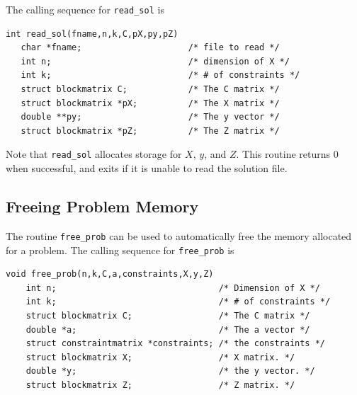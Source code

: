 \documentclass{article}
\begin{document}
The calling sequence for {\tt read\_sol} is 

\begin{verbatim}
int read_sol(fname,n,k,C,pX,py,pZ)
   char *fname;                     /* file to read */
   int n;                           /* dimension of X */
   int k;                           /* # of constraints */
   struct blockmatrix C;            /* The C matrix */
   struct blockmatrix *pX;          /* The X matrix */
   double **py;                     /* The y vector */
   struct blockmatrix *pZ;          /* The Z matrix */
\end{verbatim}
Note that {\tt read\_sol} allocates storage for $X$, $y$, and $Z$.  This
routine returns 0 when successful, and exits if it is unable to read
the solution file.  

\subsection*{Freeing Problem Memory}
The routine {\tt free\_prob} can be used to automatically 
free the memory allocated for a problem.  The calling sequence
for {\tt free\_prob} is

\begin{verbatim}
void free_prob(n,k,C,a,constraints,X,y,Z)
    int n;                                /* Dimension of X */
    int k;                                /* # of constraints */
    struct blockmatrix C;                 /* The C matrix */
    double *a;                            /* The a vector */
    struct constraintmatrix *constraints; /* the constraints */
    struct blockmatrix X;                 /* X matrix. */ 
    double *y;                            /* the y vector. */
    struct blockmatrix Z;                 /* Z matrix. */
\end{verbatim}


 
\end{document}
